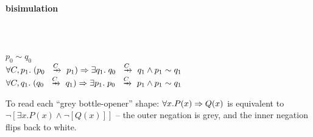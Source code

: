 \documentclass{article}
\begin{document}
\vspace{5em}

\begin{center}
    \textbf{bisimulation}\\~\\
    \\~\\
    $p_0\sim q_0$\\
    $\forall C,p_1.\; (p_0\xr{C} p_1)\ra \exists q_1.\; q_0\xr{C} q_1 \land p_1\sim q_1$\\
    $\forall C,q_1.\; (q_0\xr{C} q_1)\ra \exists p_1.\; p_0\xr{C} p_1\land p_1\sim q_1$
\end{center}

To read each ``grey bottle-opener'' shape: $\forall x. P(x)\Rightarrow Q(x)$ is equivalent to $\neg[\exists x. P(x) \land \neg[Q(x)]]$ -- the outer negation is grey, and the inner negation flips back to white.
\end{document}
